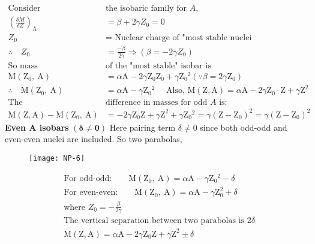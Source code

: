 \begin{align*}
\text{Consider }&\text{the isobaric family for $A$,}\\
\left(\frac{\delta M}{\delta Z}\right)_{\mathrm{A}}&=\beta+2 \gamma Z_0=0\\
Z_0&=\text { Nuclear charge of "most stable nuclei }\\
\therefore \quad Z_0&=\frac{-\beta}{2 \gamma} \Rightarrow\left(\beta=-2 \gamma Z_0\right)\\
\text{So mass }&\text{of the "most stable" isobar is}\\
\mathrm{M}\left(\mathrm{Z}_0, \mathrm{~A}\right)&=\alpha \mathrm{A}-2 \gamma \mathrm{Z}_0 \mathrm{Z}_0+\gamma \mathrm{Z}_0{ }^2\left(\because \beta=2 \gamma \mathrm{Z}_0\right) \\
\therefore \quad \mathrm{M}\left(\mathrm{Z}_0, \mathrm{~A}\right)&=\alpha \mathrm{A}-\gamma \mathrm{Z}_0{ }^2 \quad \text { Also, } \mathrm{M}(\mathrm{Z}, \mathrm{A})=\alpha \mathrm{A}-2 \gamma \mathrm{Z}_0 \cdot \mathrm{Z}+\gamma \mathrm{Z}^2\\
\text{The }&\text{difference in masses for odd $A$ is:}\\
\mathrm{M}(\mathrm{Z}, \mathrm{A})-\mathrm{M}\left(\mathrm{Z}_0, \mathrm{~A}\right)&=-2 \gamma \mathrm{Z}_0 \mathrm{Z}+\gamma \mathrm{Z}^2+\gamma \mathrm{Z}_0{ }^2=\gamma\left(\mathrm{Z}-\mathrm{Z}_0\right)^2=\gamma\left(\mathrm{Z}-\mathrm{Z}_0\right)^2
\end{align*}
\textbf{Even A isobars }$\mathbf{(\delta \neq 0)}$
Here pairing term $\delta \neq 0$ since both odd-odd and even-even nuclei are included. So two parabolas,
\begin{figure}[H]
	\centering
	\texttt{[image: NP-6]}
	\caption{}
	\label{}
\end{figure}
\begin{align*}
&\text{For odd-odd:}\qquad
\mathrm{M}\left(\mathrm{Z}_0, \mathrm{~A}\right)=\alpha \mathrm{A}-\gamma \mathrm{Z}_0{ }^2-\delta\\
&\text{For even-even:}\qquad 
\mathrm{M}\left(\mathrm{Z}_0, \mathrm{~A}\right)=\alpha \mathrm{A}-\gamma \mathrm{Z}_0^2+\delta\\
&\text{where }Z_0=-\frac{\beta}{2 \gamma}\\
&\text{The vertical separation between two parabolas is $2 \delta$}\\
&\mathrm{M}(\mathrm{Z}, \mathrm{A})=\alpha \mathrm{A}-2 \gamma \mathrm{Z}_0 \mathrm{Z}+\gamma \mathrm{Z}^2 \pm \delta
\end{align*}








